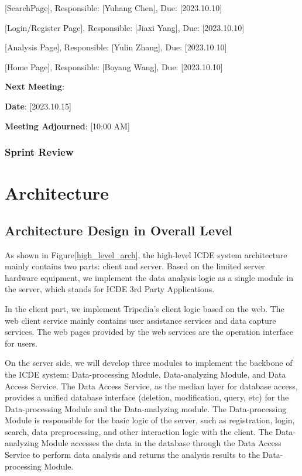 \documentclass[conference]{IEEEtran}
\begin{document}
[SearchPage], Responsible: [Yuhang Chen], Due: [2023.10.10]

[Login/Register Page], Responsible: [Jiaxi Yang], Due: [2023.10.10]

[Analysis Page], Responsible: [Yulin Zhang], Due: [2023.10.10]

[Home Page], Responsible: [Boyang Wang], Due: [2023.10.10]

\textbf{Next Meeting}:

\textbf{Date}: [2023.10.15]

\textbf{Meeting Adjourned}: [10:00 AM]

\subsubsection{\textbf{Sprint Review}}


\section{\textbf{Architecture}}


\subsection{\textbf{Architecture Design in Overall Level}}

As shown in Figure\ref{high_level_arch}, the high-level ICDE system architecture mainly contains two parts: client and server. Based on the limited server hardware equipment, we implement the data analysis logic as a single module in the server, which stands for ICDE 3rd Party Applications. 

In the client part, we implement Tripedia's client logic based on the web. The web client service mainly contains user assistance services and data capture services. The web pages provided by the web services are the operation interface for users.

On the server side, we will develop three modules to implement the backbone of the ICDE system: Data-processing Module, Data-analyzing Module, and Data Access Service. The Data Access Service, as the median layer for database access, provides a unified database interface (deletion, modification, query, etc) for the Data-processing Module and the Data-analyzing module. The Data-processing Module is responsible for the basic logic of the server, such as registration, login, search, data preprocessing, and other interaction logic with the client. The Data-analyzing Module accesses the data in the database through the Data Access Service to perform data analysis and returns the analysis results to the Data-processing Module.
\end{document}
